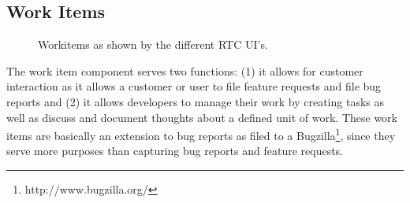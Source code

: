 \subsection{Work Items}
\begin{figure}
\centering
{}

\caption{Workitems as shown by the different RTC UI's.}
\label{fig:wi}
\end{figure}
The work item component serves two functions: (1) it allows for customer interaction as it allows a customer or user to file feature requests and file bug reports and (2) it allows developers to manage their work by creating tasks as well as discuss and document thoughts about a defined unit of work.
These work items are basically an extension to bug reports as filed to a Bugzilla\footnote{http://www.bugzilla.org/}, since they serve more purposes than capturing bug reports and feature requests.

